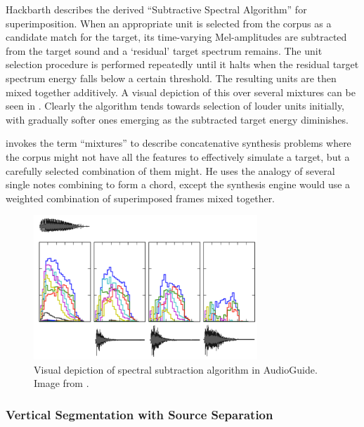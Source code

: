 {{Hackbarth \citep{Hackbarth2010} describes the derived ``Subtractive Spectral Algorithm'' for superimposition. When an appropriate unit is selected from the corpus as a candidate match for the target, its time-varying Mel-amplitudes are subtracted from the target sound and a `residual' target spectrum remains. The unit selection procedure is performed repeatedly until it halts when the residual target spectrum energy falls below a certain threshold. The resulting units are then mixed together additively. A visual depiction of this over several mixtures can be seen in . Clearly the algorithm tends towards selection of louder units initially, with gradually softer ones emerging as the subtracted target energy diminishes. 

\cite{Coleman2015} invokes the term ``mixtures'' to describe concatenative synthesis problems where the corpus might not have all the features to effectively simulate a target, but a carefully selected combination of them might. He uses the analogy of several single notes combining to form a chord, except the synthesis engine would use a weighted combination of superimposed frames mixed together.

\begin{figure}
	\begin{center}
		\includegraphics[width=0.75\textwidth]{ch05_pyconcat/figures/spectrum_subtraction}
	\end{center}
	\caption[Spectral Subtraction Algorithm in AudioGuide]{Visual depiction of spectral subtraction algorithm in AudioGuide. Image from \cite{Hackbarth2010}.}
	\label{fig:spectrum_subtraction}
\end{figure} 

\subsubsection{Vertical Segmentation with Source Separation}

}}

